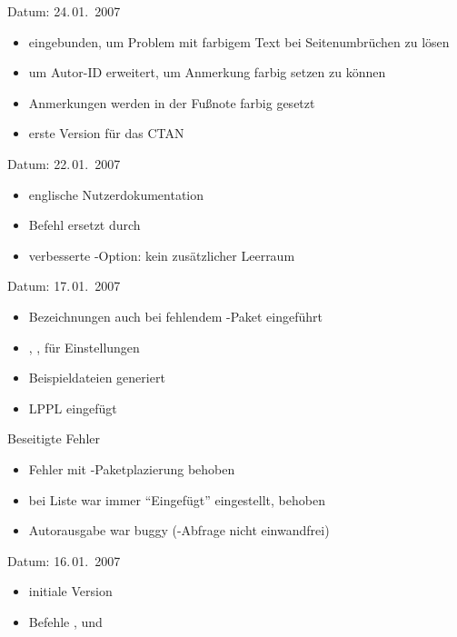 
Datum: 24.\,01.~2007
\begin{itemize}
	\item {} eingebunden, um Problem mit farbigem Text bei Seitenumbrüchen zu lösen
	\item {} um Autor-ID erweitert, um Anmerkung farbig setzen zu können
	\item Anmerkungen werden in der Fußnote farbig gesetzt
	\item erste Version für das CTAN
\end{itemize}


Datum: 22.\,01.~2007
\begin{itemize}
	\item englische Nutzerdokumentation
	\item Befehl  ersetzt durch 
	\item verbesserte -Option: kein zusätzlicher Leerraum
\end{itemize}


Datum: 17.\,01.~2007
\begin{itemize}
	\item Bezeichnungen auch bei fehlendem -Paket eingeführt
	\item {}, ,  für Einstellungen
	\item Beispieldateien generiert
	\item LPPL eingefügt
\end{itemize}
Beseitigte Fehler
\begin{itemize}
	\item Fehler mit -Paketplazierung behoben
	\item bei Liste war immer "`Eingefügt"' eingestellt, behoben
	\item Autorausgabe war buggy (-Abfrage nicht einwandfrei)
\end{itemize}


Datum: 16.\,01.~2007
\begin{itemize}
	\item initiale Version
	\item Befehle ,  und 
\end{itemize}


